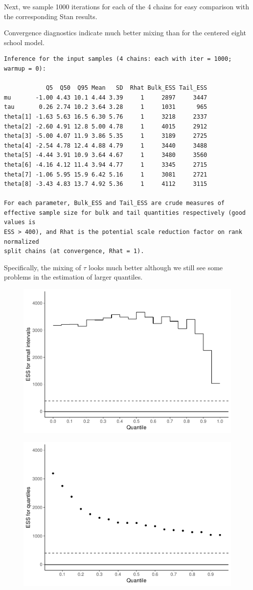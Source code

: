 \documentclass[american,]{article}
\begin{document}
Next, we sample 1000 iterations for each of the 4 chains for easy
comparison with the corresponding Stan results.

Convergence diagnostics indicate much better mixing than for the
centered eight school model.

\begin{verbatim}
Inference for the input samples (4 chains: each with iter = 1000; warmup = 0):

            Q5  Q50  Q95 Mean   SD  Rhat Bulk_ESS Tail_ESS
mu       -1.00 4.43 10.1 4.44 3.39     1     2897     3447
tau       0.26 2.74 10.2 3.64 3.28     1     1031      965
theta[1] -1.63 5.63 16.5 6.30 5.76     1     3218     2337
theta[2] -2.60 4.91 12.8 5.00 4.78     1     4015     2912
theta[3] -5.00 4.07 11.9 3.86 5.35     1     3189     2725
theta[4] -2.54 4.78 12.4 4.88 4.79     1     3440     3488
theta[5] -4.44 3.91 10.9 3.64 4.67     1     3480     3560
theta[6] -4.16 4.12 11.4 3.94 4.77     1     3345     2715
theta[7] -1.06 5.95 15.9 6.42 5.16     1     3081     2721
theta[8] -3.43 4.83 13.7 4.92 5.36     1     4112     3115

For each parameter, Bulk_ESS and Tail_ESS are crude measures of 
effective sample size for bulk and tail quantities respectively (good values is 
ESS > 400), and Rhat is the potential scale reduction factor on rank normalized
split chains (at convergence, Rhat = 1).
\end{verbatim}

Specifically, the mixing of $\tau$ looks much better although we
still see some problems in the estimation of larger quantiles.

\begin{figure}[tp]
  \centering
  \includegraphics[width=0.6\linewidth]{graphics/local-ess-jags-ncp-tau-1.pdf}
\end{figure}

\begin{figure}[tp]
  \centering
  \includegraphics[width=0.6\linewidth]{graphics/quantile-ess-jags-ncp-tau-1.pdf}
\end{figure}
\end{document}
